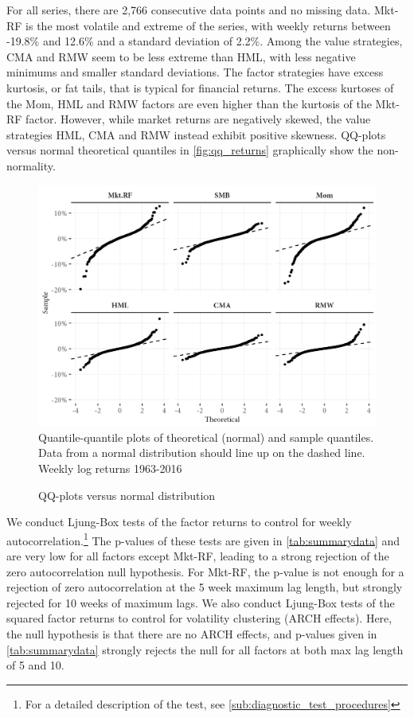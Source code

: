 For all series, there are 2,766 consecutive data points and no missing data. Mkt-RF is the most volatile and extreme of the series, with weekly returns between -19.8\% and 12.6\% and a standard deviation of 2.2\%. Among the value strategies, CMA and RMW seem to be less extreme than HML, with less negative minimums and smaller standard deviations. The factor strategies have excess kurtosis, or fat tails, that is typical for financial returns. The excess kurtoses of the Mom, HML and RMW factors are even higher than the kurtosis of the Mkt-RF factor. However, while market returns are negatively skewed, the value strategies HML, CMA and RMW instead exhibit positive skewness. QQ-plots versus normal theoretical quantiles in \autoref{fig:qq_returns} graphically show the non-normality.
\begin{figure}[htbp]
  \caption{QQ-plots versus normal distribution}
  \label{fig:qq_returns}
  \centering
  \begin{minipage}{\textwidth}
  \includegraphics[scale=1]{graphics/qq_returns.png}  
  \vspace{3mm}
  \footnotesize
  Quantile-quantile plots of theoretical (normal) and sample quantiles. Data from a normal distribution should line up on the dashed line. Weekly log returns 1963-2016
  \end{minipage}
\end{figure}


We conduct Ljung-Box tests of the factor returns to control for weekly autocorrelation.\footnote{For a detailed description of the test, see \autoref{sub:diagnostic_test_procedures}} The p-values of these tests are given in \autoref{tab:summarydata} and are very low for all factors except Mkt-RF, leading to a strong rejection of the zero autocorrelation null hypothesis. For Mkt-RF, the p-value is not enough for a rejection of zero autocorrelation at the 5 week maximum lag length, but strongly rejected for 10 weeks of maximum lags. We also conduct Ljung-Box tests of the squared factor returns to control for volatility clustering (ARCH effects). Here, the null hypothesis is that there are no ARCH effects, and p-values given in \autoref{tab:summarydata} strongly rejects the null for all factors at both max lag length of 5 and 10.

